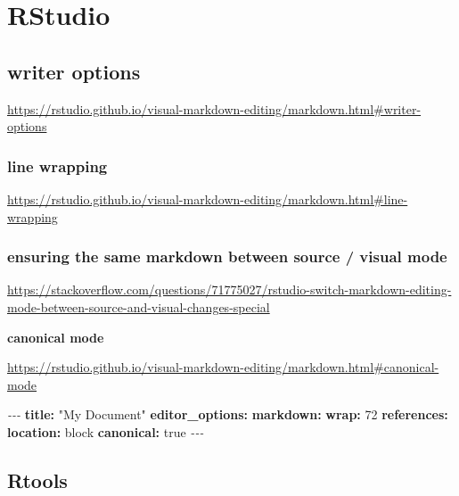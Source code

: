 \documentclass[
]{book}
\newenvironment{Shaded}{\begin{snugshade}}{\end{snugshade}}
\newcommand{\AttributeTok}[1]{\textcolor[rgb]{0.13,0.29,0.53}{#1}}
\newcommand{\CharTok}[1]{\textcolor[rgb]{0.31,0.60,0.02}{#1}}
\newcommand{\DecValTok}[1]{\textcolor[rgb]{0.00,0.00,0.81}{#1}}
\newcommand{\FunctionTok}[1]{\textcolor[rgb]{0.13,0.29,0.53}{\textbf{#1}}}
\newcommand{\KeywordTok}[1]{\textcolor[rgb]{0.13,0.29,0.53}{\textbf{#1}}}
\newcommand{\PreprocessorTok}[1]{\textcolor[rgb]{0.56,0.35,0.01}{\textit{#1}}}
\newcommand{\StringTok}[1]{\textcolor[rgb]{0.31,0.60,0.02}{#1}}
\theoremstyle{definition}
\theoremstyle{definition}
\theoremstyle{definition}
\theoremstyle{definition}
\theoremstyle{remark}
\begin{document}
\section{RStudio}\label{rstudio}

\subsection{writer options}\label{writer-options}

\url{https://rstudio.github.io/visual-markdown-editing/markdown.html\#writer-options}

\subsubsection{line wrapping}\label{line-wrapping}

\url{https://rstudio.github.io/visual-markdown-editing/markdown.html\#line-wrapping}

\subsubsection{ensuring the same markdown between source / visual mode}\label{ensuring-the-same-markdown-between-source-visual-mode}

\url{https://stackoverflow.com/questions/71775027/rstudio-switch-markdown-editing-mode-between-source-and-visual-changes-special}

\textbf{canonical mode}

\url{https://rstudio.github.io/visual-markdown-editing/markdown.html\#canonical-mode}

\begin{Shaded}
\begin{Highlighting}[]
\PreprocessorTok{{-}{-}{-}}
\FunctionTok{title}\KeywordTok{:}\AttributeTok{ }\StringTok{"My Document"}
\FunctionTok{editor\_options}\KeywordTok{:}
\AttributeTok{  }\FunctionTok{markdown}\KeywordTok{:}
\AttributeTok{    }\FunctionTok{wrap}\KeywordTok{:}\AttributeTok{ }\DecValTok{72}
\AttributeTok{    }\FunctionTok{references}\KeywordTok{:}\AttributeTok{ }
\AttributeTok{      }\FunctionTok{location}\KeywordTok{:}\AttributeTok{ block}
\AttributeTok{    }\FunctionTok{canonical}\KeywordTok{:}\AttributeTok{ }\CharTok{true}
\PreprocessorTok{{-}{-}{-}}
\end{Highlighting}
\end{Shaded}

\subsection{Rtools}\label{rtools}
\end{document}

